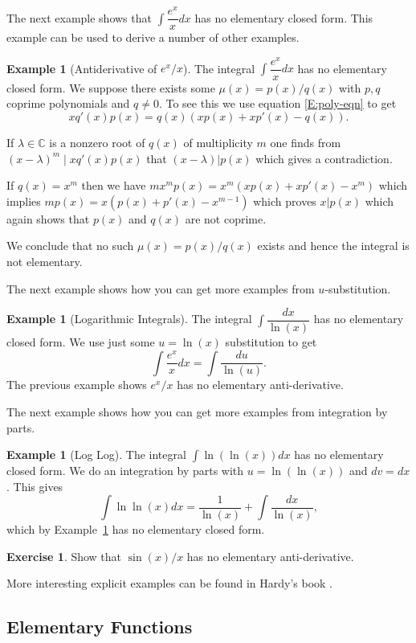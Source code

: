 \documentclass[12pt]{book}
\numberwithin{equation}{section}
\theoremstyle{definition}
\newtheorem{example}[theorem]{Example}
\newtheorem{exercise}[theorem]{Exercise}
\theoremstyle{remark}
\newcommand{\CC}{\mathbb{C}}
\begin{document}
The next example shows that $\int \dfrac{e^x}{x}dx$ has no elementary closed form. 
This example can be used to derive a number of other examples. 
\begin{example}[Antiderivative of $e^x/x$]
	The integral $\int \dfrac{e^x}{x}dx$ has no elementary closed form.
	We suppose there exists some $\mu(x) = p(x)/q(x)$ with $p,q$ coprime polynomials and $q\neq 0$. 
	To see this we use equation \eqref{E:poly-eqn} to get 
	 $$ xq'(x)p(x) = q(x)( xp(x) + xp'(x) -q(x)).$$
	 
	 If $\lambda\in \CC$ is a nonzero root of $q(x)$ of multiplicity $m$ one finds from $(x-\lambda)^m \mid x q'(x)p(x)$ that $(x-\lambda)\vert p(x)$ which gives a contradiction. 
	 
	 If $q(x) = x^m$ then we have $mx^m p(x) = x^m( xp(x)+xp'(x)-x^m)$ which implies $mp(x) = x( p(x) + p'(x) - x^{m-1})$ which proves $x \vert p(x)$ which again shows that $p(x)$ and $q(x)$ are not coprime.
	 
	 We conclude that no such $\mu(x) = p(x)/q(x)$ exists and hence the integral is not elementary. 
\end{example}

The next example shows how you can get more examples from $u$-substitution.
\begin{example}[Logarithmic Integrals]\label{E:log-recip}
	The integral $\int \dfrac{dx}{\ln(x)}$ has no elementary closed form.
	We use just some $u = \ln(x)$ substitution to get 
	$$\int \dfrac{e^x}{x} dx = \int \frac{du}{\ln(u)}.$$
	The previous example shows $e^x/x$ has no elementary anti-derivative. 
\end{example}
The next example shows how you can get more examples from integration by parts. 
\begin{example}[Log Log]
	The integral $\int \ln(\ln(x)) dx$ has no elementary closed form.
	We do an integration by parts with $u = \ln(\ln(x))$ and $dv=dx$. 
	This gives 
	$$\int \ln\ln(x) dx = \frac{1}{\ln(x)} + \int \dfrac{dx}{\ln(x)},$$
	which by Example~\ref{E:log-recip} has no elementary closed form.
\end{example}

\begin{exercise}
	Show that $\sin(x)/x$ has no elementary anti-derivative.
\end{exercise}

More interesting explicit examples can be found in Hardy's book \cite[pg 52]{Hardy1971}.

\subsection{Elementary Functions}
\end{document}
